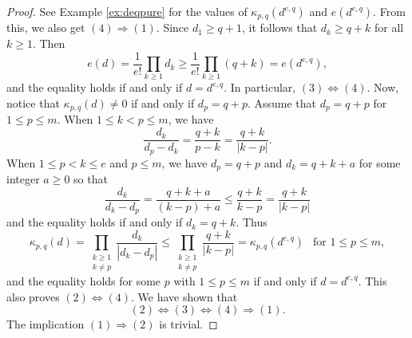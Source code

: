 \documentclass[10pt,a4paper]{amsart}
\begin{document}
\begin{proof}
See Example \ref{ex:deqpure} for the values of $\kappa_{p,q}(d^{e,q})$ and $e(d^{e,q})$. From this, we also get $(4) \Longrightarrow (1)$.
Since $d_1 \geq q+1$, it follows that $d_k \geq q+k$ for all $k \geq 1$. 
Then
$$
e(d)=\frac{1}{e!} \prod_{k \geq 1} d_k \geq \frac{1}{e!} \prod_{k \geq 1} (q+k) = e(d^{e,q}), 
$$
and the equality holds if and only if $d=d^{e,q}$. In particular, $(3) \Longleftrightarrow (4)$. Now, notice that $\kappa_{p,q}(d) \neq 0$ if and only if $d_p=q+p$. Assume that $d_p=q+p$ for $1 \leq p \leq m$. 
When $1 \leq k < p \leq m$, we have
$$
\frac{d_k}{d_p-d_k} = \frac{q+k}{p-k} = \frac{q+k}{|k-p|}.
$$
When $1 \leq p < k \leq e$ and $p \leq m$, we have $d_p=q+p$ and $d_k=q+k+a$ for some integer $a \geq 0$ so that
$$
\frac{d_k}{d_k-d_p} = \frac{q+k+a}{(k-p)+a} \leq \frac{q+k}{k-p} = \frac{q+k}{|k-p|}
$$
and the equality holds if and only if $d_k=q+k$.
Thus
$$
\kappa_{p,q}(d)=\prod_{\substack{k \geq 1 \\ k \neq p}} \frac{d_k}{|d_k - d_p|} \leq \prod_{\substack{k \geq 1 \\ k \neq p}} \frac{q+k}{|k-p|} = \kappa_{p,q}(d^{e,q})~~\text{ for $1 \leq p \leq m$},
$$
and the equality holds for some $p$ with $1 \leq p \leq m$ if and only if $d=d^{e,q}$. This also proves $(2) \Longleftrightarrow (4)$. We have shown that 
$$
(2) \Longleftrightarrow (3) \Longleftrightarrow (4) \Longrightarrow (1).
$$
The implication $(1) \Longrightarrow (2)$ is trivial.
\end{proof}
\end{document}
